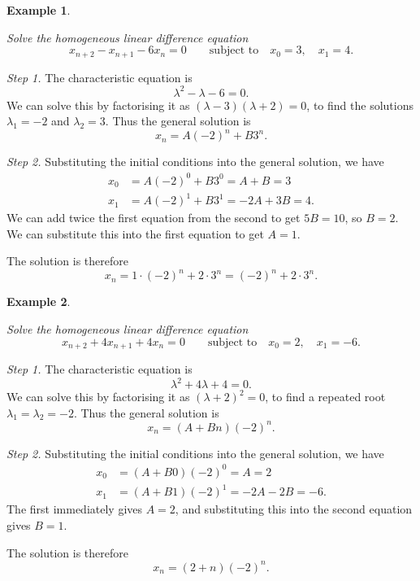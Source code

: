 \documentclass[
  a4paper,
]{article}
\theoremstyle{definition}
\theoremstyle{definition}
\newtheorem{example}{Example}[section]
\theoremstyle{definition}
\theoremstyle{remark}
\begin{document}
\begin{example}
\protect\hypertarget{exm:lde1}{}\label{exm:lde1}

\emph{Solve the homogeneous linear difference equation}
\[ x_{n+2} - x_{n+1} - 6x_n = 0 \qquad \text{subject to} \quad x_0 = 3,\quad x_1 = 4 . \]

\emph{Step 1.} The characteristic equation is
\[ \lambda^2 - \lambda - 6 = 0 . \]
We can solve this by factorising it as \((\lambda - 3) (\lambda + 2) = 0\),
to find the solutions \(\lambda_1 = -2\) and \(\lambda_2 = 3\). Thus the general solution is
\[ x_n = A(-2)^n + B3^n . \]

\emph{Step 2.} Substituting the initial conditions into the general solution, we have
\begin{align*}
x_0 &= A(-2)^0 + B3^0 = A + B = 3 \\
x_1 &= A(-2)^1 + B3^1 = -2A + 3B = 4 .
\end{align*}
We can add twice the first equation from the second to get \(5B = 10\), so \(B=2\). We can substitute this into the first equation to get \(A = 1\).

The solution is therefore
\[ x_n = 1\cdot(-2)^n + 2 \cdot 3^n = (-2)^n + 2 \cdot 3^n . \]

\end{example}

\begin{example}
\protect\hypertarget{exm:lde2}{}\label{exm:lde2}

\emph{Solve the homogeneous linear difference equation}
\[ x_{n+2} + 4x_{n+1} +4x_n = 0 \qquad \text{subject to} \quad x_0 = 2,\quad x_1 = -6 . \]

\emph{Step 1.} The characteristic equation is
\[ \lambda^2 + 4\lambda + 4 = 0 . \]
We can solve this by factorising it as \((\lambda + 2)^2 = 0\), to find a repeated root \(\lambda_1 = \lambda_2 = -2\). Thus the general solution is
\[ x_n = (A + Bn) (-2)^n . \]

\emph{Step 2.} Substituting the initial conditions into the general solution, we have
\begin{align*}
x_0 &= (A + B0)(-2)^0 = A = 2 \\
x_1 &= (A + B1)(-2)^1 = -2A - 2B = -6 .
\end{align*}
The first immediately gives \(A = 2\), and substituting this into the second equation gives \(B = 1\).

The solution is therefore
\[ x_n = (2 + n)(-2)^n . \]

\end{example}
\end{document}
